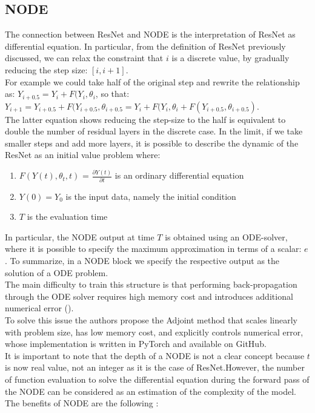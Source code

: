 \documentclass[LaM,binding=0.6cm]{sapthesis}
\begin{document}
\subsection{NODE}
The connection between ResNet and NODE is the interpretation of ResNet as differential equation. In particular, from the definition of ResNet previously discussed, we can relax the constraint that $i$ is a discrete value, by gradually reducing the step size: $[i,i+1]$.\\For example we could take half of the original step and rewrite the relationship as: $Y_{i+0.5} = Y_{i} +F(Y_{i},\theta_{i}$, so that: $Y_{i+1} = Y_{i+0.5} +F(Y_{i+0.5},\theta_{i+0.5} = Y_{i} + F(Y_{i},\theta_{i} + F(Y_{i+0.5},\theta_{i+0.5})$.\\The latter equation shows reducing the step-size to the half is equivalent to double the number of residual layers in the discrete case. In the limit, if we take smaller steps and add more layers, it is possible to describe the dynamic of the ResNet as an initial value problem where: 
\begin{enumerate}
\item $F(Y(t),\theta_{t},t)$ = $\frac{\partial Y(t)}{ \partial t}$ is an ordinary differential equation
\item $Y(0)=Y_0$ is the input data, namely the initial condition
\item $T$ is the evaluation time 
\end{enumerate}
In particular, the NODE output at time $T$ is obtained using an ODE-solver, where it is possible to specify the maximum approximation in terms of a scalar: $e$. To summarize, in a NODE block we specify the respective output as the solution of a ODE problem.\\The main difficulty to train this structure is that performing back-propagation through the ODE solver requires high memory cost and introduces additional numerical error (\cite{DBLP:journals/corr/abs-1806-07366}).\\To solve this issue the authors propose the Adjoint method that scales linearly with problem size, has low memory cost, and explicitly controls numerical error, whose implementation is written in PyTorch and available on GitHub.\\It is important to note that the depth of a NODE is not a clear concept because $t$ is now real value, not an integer as it is the case of ResNet.However, the number of function  evaluation to solve the differential equation during the forward pass of the NODE can be considered as an estimation of the complexity of the  model.\\The benefits of NODE are the following :
\end{document}
